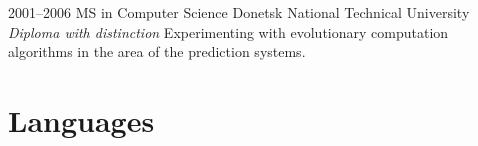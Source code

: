 \documentclass[11pt,a4paper,roman]{moderncv}        %
\begin{document}
\cventry
    {2001--2006}
    {MS in Computer Science}
    {Donetsk National Technical University}
    {}
    {\newline\textit{Diploma with distinction}}
    {Experimenting with evolutionary computation algorithms in the area of the
    prediction systems.}

\medskip
\section{Languages}
\end{document}
